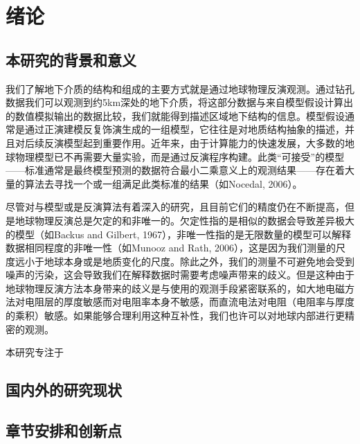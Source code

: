 \cleardoublepage

\section{绪论}

\subsection{本研究的背景和意义}

我们了解地下介质的结构和组成的主要方式就是通过地球物理反演观测。通过钻孔数据我们可以观测到约5km深处的地下介质，将这部分数据与来自模型假设计算出的数值模拟输出的数据比较，我们就能得到描述区域地下结构的信息。模型假设通常是通过正演建模反复饰演生成的一组模型，它往往是对地质结构抽象的描述，并且对后续反演模型起到重要作用。近年来，由于计算能力的快速发展，大多数的地球物理模型已不再需要大量实验，而是通过反演程序构建。此类“可接受”的模型——标准通常是最终模型预测的数据符合最小二乘意义上的观测结果——存在着大量的算法去寻找一个或一组满足此类标准的结果（如Nocedal, 2006）。

尽管对与模型或是反演算法有着深入的研究，且目前它们的精度仍在不断提高，但是地球物理反演总是欠定的和非唯一的。欠定性指的是相似的数据会导致差异极大的模型（如Backus and Gilbert, 1967），非唯一性指的是无限数量的模型可以解释数据相同程度的非唯一性（如Munooz and Rath, 2006），这是因为我们测量的尺度远小于地球本身或是地质变化的尺度。除此之外，我们的测量不可避免地会受到噪声的污染，这会导致我们在解释数据时需要考虑噪声带来的歧义。但是这种由于地球物理反演方法本身带来的歧义是与使用的观测手段紧密联系的，如大地电磁方法对电阻层的厚度敏感而对电阻率本身不敏感，而直流电法对电阻（电阻率与厚度的乘积）敏感。如果能够合理利用这种互补性，我们也许可以对地球内部进行更精密的观测。

本研究专注于
\subsection{国内外的研究现状}


\subsection{章节安排和创新点}

